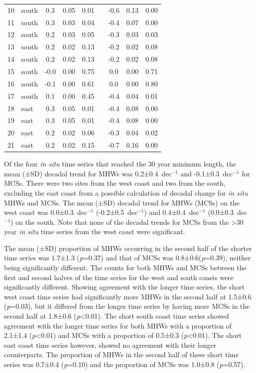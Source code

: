\documentclass[a4paper,10pt,review]{elsarticle}
\begin{document}
\begin{table}[]
\begin{tiny}
\begin{tabular}{llccccccc}
  10 & south & 0.3 & 0.05 & 0.01 && -0.6 & 0.13 & 0.00 \\ 
  11 & south & 0.3 & 0.03 & 0.04 && -0.4 & 0.07 & 0.00 \\ 
  12 & south & 0.2 & 0.03 & 0.05 && -0.3 & 0.03 & 0.03 \\ 
  13 & south & 0.2 & 0.02 & 0.13 && -0.2 & 0.02 & 0.08 \\ 
  14 & south & 0.2 & 0.02 & 0.13 && -0.2 & 0.02 & 0.08 \\ 
  15 & south & -0.0 & 0.00 & 0.75 && 0.0 & 0.00 & 0.71 \\ 
  16 & south & -0.1 & 0.00 & 0.61 && 0.0 & 0.00 & 0.80 \\ 
  17 & south & 0.1 & 0.00 & 0.45 && -0.4 & 0.04 & 0.01 \\ 
  18 & east & 0.3 & 0.05 & 0.01 && -0.4 & 0.08 & 0.00 \\ 
  19 & east & 0.3 & 0.05 & 0.01 && -0.4 & 0.08 & 0.00 \\ 
  20 & east & 0.2 & 0.02 & 0.06 && -0.3 & 0.04 & 0.02 \\ 
  21 & east & 0.2 & 0.02 & 0.15 && -0.7 & 0.16 & 0.00 \\ 
\bottomrule
\end{tabular}
\end{tiny}
\end{table}

Of the four \emph{in situ} time series that reached the 30 year minimum length, the mean (±SD) decadal trend for MHWs was 0.2±0.4~dec$^{-1}$ and -0.1±0.3~dec$^{-1}$ for MCSs. There were two sites from the west coast and two from the south, excluding the east coast from a possible calculation of decadal change for \emph{in situ} MHWs and MCSs. The mean (±SD) decadal trend for MHWs (MCSs) on the west coast was 0.0±0.3~dec$^{-1}$ (-0.2±0.5~dec$^{-1}$) and 0.4±0.4~dec$^{-1}$ (0.0±0.3~dec$^{-1}$) on the south. Note that none of the decadal trends for MCSs from the >30 year \emph{in situ} time series from the west coast were significant.

The mean (±SD) proportion of MHWs occurring in the second half of the shorter time series was 1.7±1.3 (\emph{p}=0.37) and that of MCSs was 0.8±0.6(\emph{p}=0.39), neither being significantly different. The counts for both MHWs and MCSs between the first and second halves of the time series for the west and south coasts were significantly different. Showing agreement with the longer time series, the short west coast time series had significantly more MHWs in the second half at 1.5±0.6 (\emph{p}=0.03), but it differed from the longer time series by having more MCSs in the second half at 1.8±0.6 (\emph{p}<0.01). The short south coast time series showed agreement with the longer time series for both MHWs with a proportion of 2.1±1.4 (\emph{p}<0.01) and MCSs with a proportion of 0.5±0.3 (\emph{p}<0.01). The short east coast time series however, showed no agreement with their longer counterparts. The proportion of MHWs in the second half of these short time series was 0.7±0.4 (\emph{p}=0.10) and the proportion of MCSs was 1.0±0.8 (\emph{p}=0.57).
\end{document}
